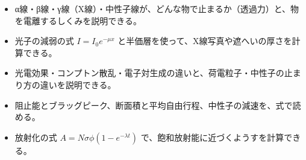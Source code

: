 
\begin{goal}
\begin{itemize}[label={\color{bkTheme}●}, leftmargin=1.6\zw, itemsep=0pt, topsep=1pt]
\item {}\enspace α線・β線・γ線（X線）・中性子線が、どんな物で止まるか（透過力）と、物を電離するしくみを説明できる。
\item {}\enspace 光子の減弱の式 $I=I_0e^{-\mu x}$ と半価層を使って、X線写真や遮へいの厚さを計算できる。
\item {}\enspace 光電効果・コンプトン散乱・電子対生成の違いと、荷電粒子・中性子の止まり方の違いを説明できる。
\item {}\enspace 阻止能とブラッグピーク、断面積と平均自由行程、中性子の減速を、式で読める。
\item {}\enspace 放射化の式 $A=N\sigma\phi(1-e^{-\lambda t})$ で、飽和放射能に近づくようすを計算できる。
\end{itemize}
\end{goal}


